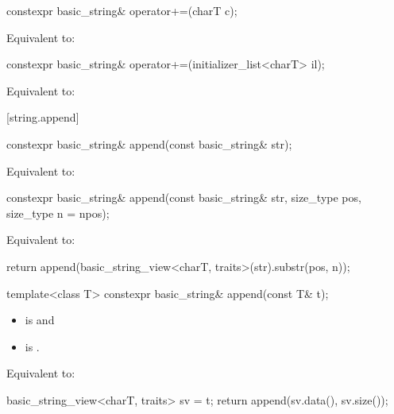 %
\begin{itemdecl}
constexpr basic_string& operator+=(charT c);
\end{itemdecl}

\begin{itemdescr}
\pnum
\effects
Equivalent to: 
\end{itemdescr}

%
\begin{itemdecl}
constexpr basic_string& operator+=(initializer_list<charT> il);
\end{itemdecl}

\begin{itemdescr}
\pnum
\effects
Equivalent to: 
\end{itemdescr}


[string.append]{}

%
\begin{itemdecl}
constexpr basic_string& append(const basic_string& str);
\end{itemdecl}

\begin{itemdescr}
\pnum
\effects
Equivalent to: 
\end{itemdescr}

%
\begin{itemdecl}
constexpr basic_string& append(const basic_string& str, size_type pos, size_type n = npos);
\end{itemdecl}

\begin{itemdescr}
\pnum
\effects
Equivalent to:
\begin{codeblock}
return append(basic_string_view<charT, traits>(str).substr(pos, n));
\end{codeblock}
\end{itemdescr}

%
\begin{itemdecl}
template<class T>
  constexpr basic_string& append(const T& t);
\end{itemdecl}

\begin{itemdescr}
\pnum
\constraints
\begin{itemize}
\item
{} is
 and
\item
{} is
.
\end{itemize}

\pnum
\effects
Equivalent to:
\begin{codeblock}
basic_string_view<charT, traits> sv = t;
return append(sv.data(), sv.size());
\end{codeblock}
\end{itemdescr}

